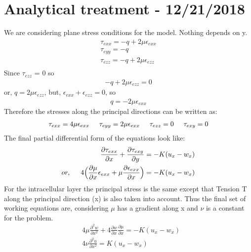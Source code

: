 \documentclass[a4paper,oneside,11pt]{report}
\begin{document}
\section*{Analytical treatment - 12/21/2018}
We are considering plane stress conditions for the model. Nothing depends on y. 
\begin{align*}
\tau_{exx} = -q + 2\mu\epsilon_{exx} \\
\tau_{eyy} = -q \\
\tau_{ezz} = -q + 2\mu\epsilon_{ezz} \\
\end{align*}
Since $\tau_{ezz}$  = 0 so
\begin{align*}
-q + 2\mu\epsilon_{ezz} = 0
\end{align*}
or, $q=2\mu\epsilon_{ezz}$, but, $\epsilon_{exx} + \epsilon_{ezz} = 0$, so 
\begin{align*}
q=-2\mu\epsilon_{exx}
\end{align*}
Therefore the stresses along the principal directions can be written as:
\begin{align*}
\tau_{exx} = 4\mu\epsilon_{exx} \hspace{0.5cm} \tau_{eyy} = 2\mu\epsilon_{exx}\hspace{0.5cm} \tau_{ezz}=0\hspace{0.5cm}\tau_{exy}=0
\end{align*}
The final partial differential form of the equations look like: 
\begin{align*}
\frac{\partial\tau_{exx}}{\partial x} + \frac{\partial\tau_{exy}}{\partial y} = -K(u_x - w_x) \\
or, \hspace{0.5cm}4\Big ( \frac{\partial \mu}{\partial x}\epsilon_{exx}  + \mu \frac{\partial \epsilon_{exx}}{\partial x}\Big ) = -K(u_x - w_x)
\end{align*}
For the intracellular layer the principal stress is the same except that Tension T along the principal direction (x) is also taken into account. Thus the final set of working equations are, considering $\mu$ has a gradient along x and $\nu$ is a constant for the problem. 
\[\boxed{\!\begin{aligned}
	&4\mu\frac{\partial^2 w}{\partial x^2} + 4\frac{\partial w}{\partial x}\frac{\partial \mu}{\partial x} = -K(u_x - w_x) \\
 &4\nu\frac{\partial^2 u}{\partial x^2} = K(u_x - w_x)
\end{aligned}
}
\]
\end{document}
